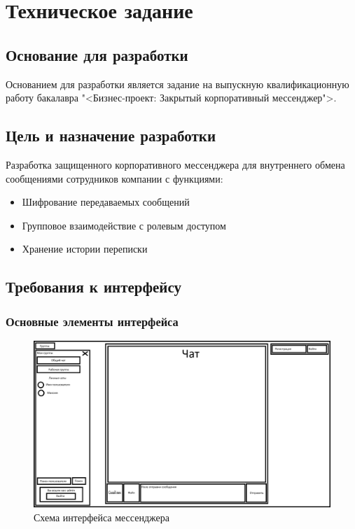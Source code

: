 \section{Техническое задание}
\subsection{Основание для разработки}

Основанием для разработки является задание на выпускную квалификационную работу бакалавра "<Бизнес-проект: Закрытый корпоративный мессенджер">.

\subsection{Цель и назначение разработки}

Разработка защищенного корпоративного мессенджера для внутреннего обмена сообщениями сотрудников компании с функциями:
\begin{itemize}
	\item Шифрование передаваемых сообщений
	\item Групповое взаимодействие с ролевым доступом
	\item Хранение истории переписки
\end{itemize}
\subsection{Требования к интерфейсу}

\subsubsection{Основные элементы интерфейса}

\begin{figure}[h]
	\centering
	\includegraphics[width=0.8\linewidth]{"images/UI макет"}
	\caption{Схема интерфейса мессенджера}
	\label{fig:ui-main}
\end{figure}

